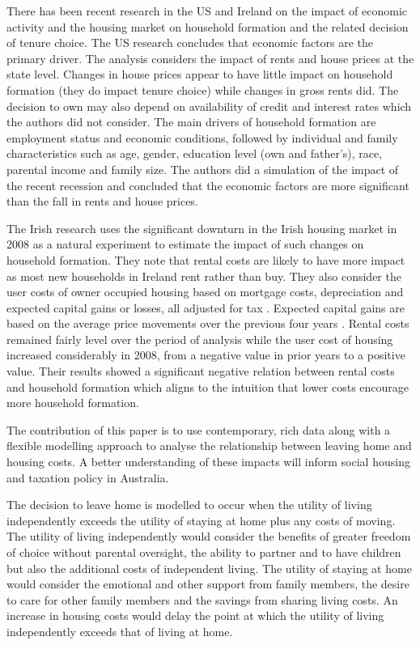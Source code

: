 \documentclass[12pt]{article}
\begin{document}
There has been recent research in the US \parencite{lee2013happens} and Ireland \parencite{byrne2014household} on the impact of economic activity and the housing market on household formation and the related decision of tenure choice. The US research concludes that economic factors are the primary driver. The analysis considers the impact of rents and house prices at the state level. Changes in house prices appear to have little impact on household formation (they do impact tenure choice) while changes in gross rents did. The decision to own may also depend on availability of credit and interest rates which the authors did not consider. The main drivers of household formation are employment status and economic conditions, followed by individual and family characteristics such as age, gender, education level (own and father's), race, parental income and family size. The authors did a simulation of the impact of the recent recession and concluded that the economic factors are more significant than the fall in rents and house prices.

The Irish research uses the significant downturn in the Irish housing market in 2008 as a natural experiment to estimate the impact of such changes on household formation. They note that rental costs are likely to have more impact as most new households in Ireland rent rather than buy. They also consider the user costs of owner occupied housing based on mortgage costs, depreciation and expected capital gains or losses, all adjusted for tax \parencite{duffy2013ESRI}. Expected capital gains are based on the average price movements over the previous four years \parencite{browne2013understanding}. Rental costs remained fairly level over the period of analysis while the user cost of housing increased considerably in 2008, from a negative value in prior years to a positive value. Their results showed a significant negative relation between rental costs and household formation which aligns to the intuition that lower costs encourage more household formation.

The contribution of this paper is to use contemporary, rich data along with a flexible modelling approach to analyse the relationship between leaving home and housing costs. A better understanding of these impacts will inform social housing and taxation policy in Australia.

The decision to leave home is modelled to occur when the utility of living independently exceeds the utility of staying at home plus any costs of moving.  The utility of living independently would consider the benefits of greater freedom of choice without parental oversight, the ability to partner and to have children but also the additional costs of independent living.  The utility of staying at home would consider the emotional and other support from family members, the desire to care for other family members and the savings from sharing living costs. An increase in housing costs would delay the point at which the utility of living independently exceeds that of living at home.
\end{document}
